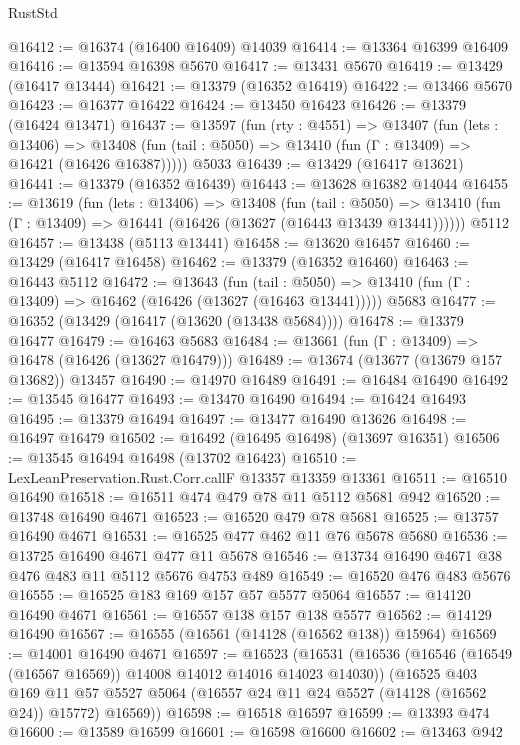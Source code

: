 \begin{lexlean}{RustStd}
\begin{coremodule}
@16412 := @16374 (@16400 @16409) @14039
@16414 := @13364 @16399 @16409
@16416 := @13594 @16398 @5670
@16417 := @13431 @5670
@16419 := @13429 (@16417 @13444)
@16421 := @13379 (@16352 @16419)
@16422 := @13466 @5670
@16423 := @16377 @16422
@16424 := @13450 @16423
@16426 := @13379 (@16424 @13471)
@16437 := @13597
    (fun (rty : @4551) =>
    @13407
      (fun (lets : @13406) =>
      @13408 (fun (tail : @5050) => @13410 (fun (Γ : @13409) => @16421 (@16426 @16387)))))
    @5033
@16439 := @13429 (@16417 @13621)
@16441 := @13379 (@16352 @16439)
@16443 := @13628 @16382 @14044
@16455 := @13619
    (fun (lets : @13406) =>
    @13408
      (fun (tail : @5050) =>
      @13410 (fun (Γ : @13409) => @16441 (@16426 (@13627 (@16443 @13439 @13441))))))
    @5112
@16457 := @13438 (@5113 @13441)
@16458 := @13620 @16457
@16460 := @13429 (@16417 @16458)
@16462 := @13379 (@16352 @16460)
@16463 := @16443 @5112
@16472 := @13643
    (fun (tail : @5050) => @13410 (fun (Γ : @13409) => @16462 (@16426 (@13627 (@16463 @13441)))))
    @5683
@16477 := @16352 (@13429 (@16417 (@13620 (@13438 @5684))))
@16478 := @13379 @16477
@16479 := @16463 @5683
@16484 := @13661 (fun (Γ : @13409) => @16478 (@16426 (@13627 @16479)))
@16489 := @13674 (@13677 (@13679 @157 @13682)) @13457
@16490 := @14970 @16489
@16491 := @16484 @16490
@16492 := @13545 @16477
@16493 := @13470 @16490
@16494 := @16424 @16493
@16495 := @13379 @16494
@16497 := @13477 @16490 @13626
@16498 := @16497 @16479
@16502 := @16492 (@16495 @16498) (@13697 @16351)
@16506 := @13545 @16494 @16498 (@13702 @16423)
@16510 := LexLeanPreservation.Rust.Corr.callF @13357 @13359 @13361
@16511 := @16510 @16490
@16518 := @16511 @474 @479 @78 @11 @5112 @5681 @942
@16520 := @13748 @16490 @4671
@16523 := @16520 @479 @78 @5681
@16525 := @13757 @16490 @4671
@16531 := @16525 @477 @462 @11 @76 @5678 @5680
@16536 := @13725 @16490 @4671 @477 @11 @5678
@16546 := @13734 @16490 @4671 @38 @476 @483 @11 @5112 @5676 @4753 @489
@16549 := @16520 @476 @483 @5676
@16555 := @16525 @183 @169 @157 @57 @5577 @5064
@16557 := @14120 @16490 @4671
@16561 := @16557 @138 @157 @138 @5577
@16562 := @14129 @16490
@16567 := @16555 (@16561 (@14128 (@16562 @138)) @15964)
@16569 := @14001 @16490 @4671
@16597 := @16523
    (@16531
      (@16536 (@16546 (@16549 (@16567 @16569)) @14008 @14012 @14016 @14023 @14030))
      (@16525
        @403
        @169
        @11
        @57
        @5527
        @5064
        (@16557 @24 @11 @24 @5527 (@14128 (@16562 @24)) @15772)
        @16569))
@16598 := @16518 @16597
@16599 := @13393 @474
@16600 := @13589 @16599
@16601 := @16598 @16600
@16602 := @13463 @942

\end{coremodule}
\end{lexlean}
